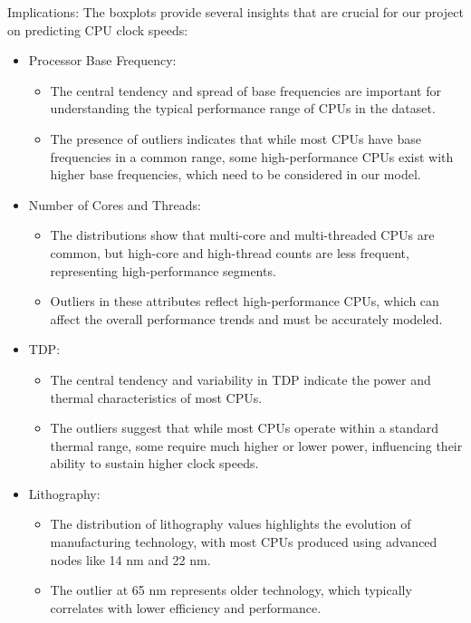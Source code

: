 Implications:
The boxplots provide several insights that are crucial for our project on predicting CPU clock speeds:

\begin{itemize}
    \item Processor Base Frequency:
    \begin{itemize}
        \item The central tendency and spread of base frequencies are important for understanding the typical performance range of CPUs in the dataset.
        \item The presence of outliers indicates that while most CPUs have base frequencies in a common range, some high-performance CPUs exist with higher base frequencies, which need to be considered in our model.
    \end{itemize}
    
    \item Number of Cores and Threads:
    \begin{itemize}
        \item The distributions show that multi-core and multi-threaded CPUs are common, but high-core and high-thread counts are less frequent, representing high-performance segments.
        \item Outliers in these attributes reflect high-performance CPUs, which can affect the overall performance trends and must be accurately modeled.
    \end{itemize}
    
    \item TDP:
    \begin{itemize}
        \item The central tendency and variability in TDP indicate the power and thermal characteristics of most CPUs.
        \item The outliers suggest that while most CPUs operate within a standard thermal range, some require much higher or lower power, influencing their ability to sustain higher clock speeds.
    \end{itemize}
    
    \item Lithography:
    \begin{itemize}
        \item The distribution of lithography values highlights the evolution of manufacturing technology, with most CPUs produced using advanced nodes like 14 nm and 22 nm.
        \item The outlier at 65 nm represents older technology, which typically correlates with lower efficiency and performance.
    \end{itemize}
\end{itemize}

